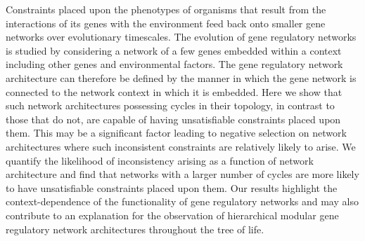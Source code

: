 Constraints placed upon the phenotypes of organisms that result from the interactions of its genes with the environment feed back onto smaller gene networks over evolutionary timescales. The evolution of gene regulatory networks is studied by considering a network of a few genes embedded within a context including other genes and environmental factors.  The gene regulatory network architecture can therefore be defined by the manner in which the gene network is connected to the network context in which it is embedded. Here we show that such network architectures possessing cycles in their topology, in contrast to those that do not, are capable of having unsatisfiable constraints placed upon them. This may be a significant factor leading to negative selection on network architectures where such inconsistent constraints are relatively likely to arise. We quantify the likelihood of inconsistency arising as a function of network architecture and find that networks with a larger number of cycles are more likely to have unsatisfiable constraints placed upon them. Our results highlight the context-dependence of the functionality of gene regulatory networks and may also contribute to an explanation for the observation of hierarchical modular gene regulatory network architectures throughout the tree of life.

